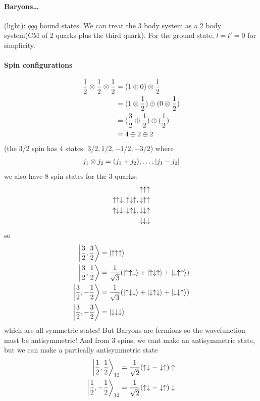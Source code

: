 \documentclass[../main.tex]{subfiles}
\begin{document}
\paragraph*{Baryons\dots} (light): $qqq$ bound states. We can treat the 3 body system as a 2 body
system(CM of 2 quarks plus the third quark). For the ground state, $l = l' = 0$ for simplicity.
\paragraph*{Spin configurations}
\begin{align*}
    \frac{1}{2} \otimes \frac{1}{2} \otimes \frac{1}{2} &= (1 \oplus 0) \otimes \frac{1}{2} \\
    &= (1 \otimes \frac{1}{2}) \oplus (0 \otimes \frac{1}{2}) \\
    &= (\frac{3}{2} \oplus \frac{1}{2}) \oplus (\frac{1}{2}) \\
    &= 4 \oplus 2 \oplus 2
\end{align*}
(the 3/2 spin has 4 states: $3/2, 1/2, -1/2, -3/2$) where
\begin{align*}
    j_1 \otimes j_2 = (j_1 + j_2), \dots, \abs{j_1 - j_2}
\end{align*}
we also have 8 spin states for the 3 quarks:
\begin{align*}
    \uparrow \uparrow \uparrow \\
    \uparrow \uparrow \downarrow, \uparrow \downarrow \uparrow, \downarrow \uparrow \uparrow \\
    \uparrow \downarrow \downarrow, \downarrow \uparrow \downarrow, \downarrow \downarrow \uparrow \\
    \downarrow \downarrow \downarrow
\end{align*}
so
\begin{align*}
    \ket{\frac{3}{2},\frac{3}{2}} &= \ket{\uparrow\uparrow\uparrow} \\
    \ket{\frac{3}{2},\frac{1}{2}} &= \frac{1}{\sqrt{3}} (\ket{\uparrow\uparrow\downarrow} + \ket{\uparrow\downarrow\uparrow} + \ket{\downarrow\uparrow\uparrow}) \\
    \ket{\frac{3}{2},-\frac{1}{2}} &= \frac{1}{\sqrt{3}} (\ket{\uparrow\downarrow\downarrow} + \ket{\downarrow\uparrow\downarrow} + \ket{\downarrow\downarrow\uparrow}) \\
    \ket{\frac{3}{2},-\frac{3}{2}} &= \ket{\downarrow\downarrow\downarrow}
\end{align*}
which are all symmetric states! But Baryons are fermions so the wavefunction must be antisymmetric!
And from 3 spins, we cant make an antisymmetric state, but we can make a partically antisymmetric
state
\begin{align*}
    \ket{\frac{1}{2}, \frac{1}{2}}_{12} = \frac{1}{\sqrt 2} (\uparrow\downarrow - \downarrow\uparrow) \uparrow \\
    \ket{\frac{1}{2}, -\frac{1}{2}}_{12} = \frac{1}{\sqrt 2} (\uparrow\downarrow - \downarrow\uparrow) \downarrow \\
\end{align*}
\end{document}

